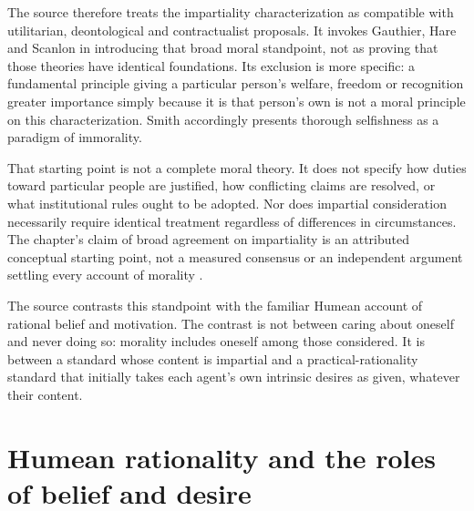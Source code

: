 The source therefore treats the impartiality characterization as compatible
with utilitarian, deontological and contractualist proposals. It invokes
Gauthier, Hare and Scanlon in introducing that broad moral standpoint,
not as proving that those theories have identical foundations. Its
exclusion is more specific: a fundamental principle giving a particular
person's welfare, freedom or recognition greater importance simply
because it is that person's own is not a moral principle on this
characterization. Smith accordingly presents thorough selfishness as a
paradigm of immorality.

That starting point is not a complete moral theory. It does not specify
how duties toward particular people are justified, how conflicting claims
are resolved, or what institutional rules ought to be adopted. Nor does
impartial consideration necessarily require identical treatment regardless
of differences in circumstances. The chapter's claim of broad agreement
on impartiality is an attributed conceptual starting point, not a measured
consensus or an independent argument settling every account of morality
\parencite[pp.~693--694]{Smith2021MoralReasons}.

The source contrasts this standpoint with the familiar Humean account
of rational belief and motivation. The contrast is not between caring
about oneself and never doing so: morality includes oneself among those
considered. It is between a standard whose content is impartial and a
practical-rationality standard that initially takes each agent's own
intrinsic desires as given, whatever their content.

\section{Humean rationality and the roles of belief and desire}
\label{sec:p11-r122-humeanism}


